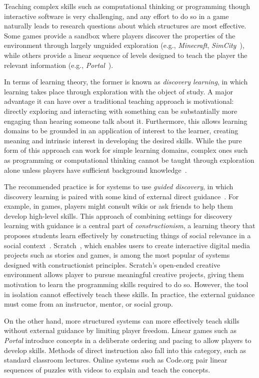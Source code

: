 \documentclass{sig-alternate}
\begin{document}
Teaching complex skills such as computational thinking or programming though interactive software is very challenging, and any effort to do so in a game naturally leads to research questions about which structures are most effective.
Some games provide a sandbox where players discover the properties of the environment through largely unguided exploration (e.g., \emph{Minecraft}, \emph{SimCity}~\cite{simcity}), while others provide a linear sequence of levels designed to teach the player the relevant information (e.g., \emph{Portal}~\cite{portal}). 

In terms of learning theory, the former is known as \emph{discovery learning}, in which learning takes place through exploration with the object of study.
A major advantage it can have over a traditional teaching approach is motivational: directly exploring and interacting with something can be substantially more engaging than hearing someone talk about it.
Furthermore, this allows learning domains to be grounded in an application of interest to the learner, creating meaning and intrinsic interest in developing the desired skills.
While the pure form of this approach can work for simple learning domains, complex ones such as programming or computational thinking cannot be taught through exploration alone unless players have sufficient background knowledge~\cite{kirschner2006minimal}. 

The recommended practice is for systems to use \emph{guided discovery}, in which discovery learning is paired with some kind of external direct guidance~\cite{mayer2004should}.  For example, in games, players might consult wikis or ask friends to help them develop high-level skills.
This approach of combining settings for discovery learning with guidance is a central part of \emph{constructionism}, a learning theory that proposes students learn effectively by constructing things of social relevance in a social context~\cite{kafai06constructionism}.
Scratch~\cite{maloney2010scratch}, which enables users to create interactive digital media projects such as stories and games, is among the most popular of systems designed with constructionist principles.
Scratch's open-ended creative environment allows player to pursue meaningful creative projects, giving them motivation to learn the programming skills required to do so.
However, the tool in isolation cannot effectively teach these skills.
In practice, the external guidance must come from an instructor, mentor, or social group.

On the other hand, more structured systems can more effectively teach skills without external guidance by limiting player freedom.
Linear games such as \emph{Portal} introduce concepts in a deliberate ordering and pacing to allow players to develop skills.
Methods of direct instruction also fall into this category, such as standard classroom lectures.
Online systems such as Code.org pair linear sequences of puzzles with videos to explain and teach the concepts.
\end{document}

